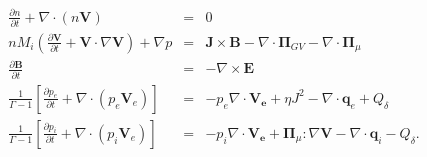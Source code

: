\documentclass[11pt]{article}  %
\begin{document}
\begin{subequations}  \label{eqn:mhd}
\begin{eqnarray}
\frac{\partial n}{\partial t} + \nabla \cdot (n\mathbf{V}) &=&0 \\
nM_i\left(\frac{\partial \mathbf{V}}{ \partial t} + \mathbf{V} \cdot \nabla \mathbf{V}\right) + \nabla p&=&  \mathbf{J} \times \mathbf{B} - \nabla \cdot \mathbf{\Pi}_{GV} - \nabla \cdot \mathbf{\Pi}_{\mu} \\ \label{eqn:velocity}
\frac{\partial \mathbf{B}}{\partial t} & =& -\nabla \times \mathbf{E}  \label{eqn:mag} \\
\frac{1}{\Gamma -1}\left[\frac{\partial p_e}{\partial t} + \nabla \cdot \left( p_e \mathbf{V}_e \right) \right] &=& -p_e\nabla\cdot \mathbf{V_e} + \eta J^2 - \nabla \cdot \mathbf{q}_e + Q_{\delta}  \label{eqn:press_e} \\
 \frac{1}{\Gamma -1}\left[\frac{\partial p_i}{\partial t} + \nabla \cdot \left( p_i \mathbf{V}_e \right) \right] &=& -p_i\nabla\cdot \mathbf{V_e} + \mathbf{\Pi}_{\mu}:\nabla \mathbf{V}- \nabla \cdot \mathbf{q}_i - Q_{\delta}. \label{eqn:press_i}
\end{eqnarray}
\end{subequations}
\end{document}
